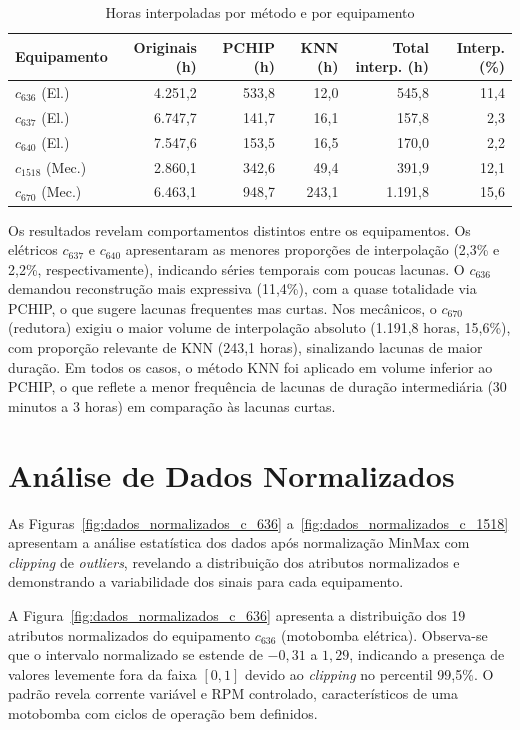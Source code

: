 \begin{table}[H]
    \centering
    \caption{Horas interpoladas por método e por equipamento}
    \label{tab:interpolacao_horas}
    \begin{tabular}{|l|r|r|r|r|r|}
        \hline
        \textbf{Equipamento} & \textbf{Originais (h)} & \textbf{PCHIP (h)} & \textbf{KNN (h)} & \textbf{Total interp. (h)} & \textbf{Interp. (\%)} \\
        \hline
        $c_{636}$ (El.) & 4.251,2 & 533,8 & 12,0  & 545,8  & 11,4 \\
        $c_{637}$ (El.) & 6.747,7 & 141,7 & 16,1  & 157,8  &  2,3 \\
        $c_{640}$ (El.) & 7.547,6 & 153,5 & 16,5  & 170,0  &  2,2 \\
        $c_{1518}$ (Mec.) & 2.860,1 & 342,6 & 49,4  & 391,9  & 12,1 \\
        $c_{670}$ (Mec.)  & 6.463,1 & 948,7 & 243,1 & 1.191,8 & 15,6 \\
        \hline
    \end{tabular}
\end{table}

Os resultados revelam comportamentos distintos entre os equipamentos. Os elétricos $c_{637}$ e $c_{640}$ apresentaram as menores proporções de interpolação (2,3\% e 2,2\%, respectivamente), indicando séries temporais com poucas lacunas. O $c_{636}$ demandou reconstrução mais expressiva (11,4\%), com a quase totalidade via PCHIP, o que sugere lacunas frequentes mas curtas. Nos mecânicos, o $c_{670}$ (redutora) exigiu o maior volume de interpolação absoluto (1.191,8 horas, 15,6\%), com proporção relevante de KNN (243,1 horas), sinalizando lacunas de maior duração. Em todos os casos, o método KNN foi aplicado em volume inferior ao PCHIP, o que reflete a menor frequência de lacunas de duração intermediária (30 minutos a 3 horas) em comparação às lacunas curtas.

\section{Análise de Dados Normalizados}

As Figuras~\ref{fig:dados_normalizados_c_636} a~\ref{fig:dados_normalizados_c_1518} apresentam a análise estatística dos dados após normalização MinMax com \textit{clipping} de \textit{outliers}, revelando a distribuição dos atributos normalizados e demonstrando a variabilidade dos sinais para cada equipamento.

A Figura~\ref{fig:dados_normalizados_c_636} apresenta a distribuição dos 19 atributos normalizados do equipamento $c_{636}$ (motobomba elétrica). Observa-se que o intervalo normalizado se estende de $-0,31$ a $1,29$, indicando a presença de valores levemente fora da faixa $[0,1]$ devido ao \textit{clipping} no percentil 99,5\%. O padrão revela corrente variável e RPM controlado, característicos de uma motobomba com ciclos de operação bem definidos.

